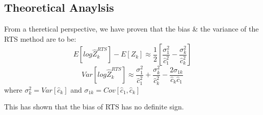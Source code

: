 

\subsection{Theoretical Anaylsis}










From a theretical perspective, we have proven that the bias \& the variance of the RTS method are to be:
\begin{equation}
E{[ log \hat{Z}_{k}^{RTS} ]} - E{[Z_{k}]} \approx \frac{1}{2}{[\frac{\sigma^{2}_{1}}{\hat{c}^{2}_{1}}-\frac{\sigma^{2}_{k}}{\hat{c}^{2}_{k}}]} 
\end{equation}
\begin{equation}
Var{[ log \hat{Z}_{k}^{RTS} ]} \approx \frac{\sigma^{2}_{1}}{\hat{c}^{2}_{1}} + \frac{\sigma^{2}_{k}}{\hat{c}^{2}_{k}} - \frac{2\sigma_{1k}}{\hat{c}_{k}\hat{c}_{1}}
\end{equation}
where $\sigma^{2}_{k} = Var{[\hat{c}_{k}]}$ and $\sigma_{1k} = Cov{[\hat{c}_{1},\hat{c}_{k}]}$

This has shown that the bias of RTS has no definite sign.

